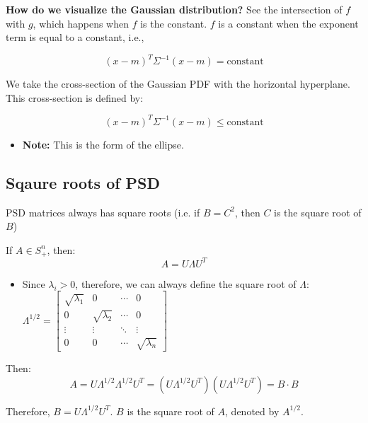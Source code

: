 \begin{example}


    \vspace{1em}

    \textbf{How do we visualize the Gaussian distribution?} See the intersection of $f$ with $g$, which happens when $f$ is the constant. $f$ is a constant when the exponent term is equal to a constant, i.e., 

\[
(x - m)^T \Sigma^{-1} (x - m) = \text{constant}
\]

We take the cross-section of the Gaussian PDF with the horizontal hyperplane. This cross-section is defined by:

\[
(x - m)^T \Sigma^{-1} (x - m) \leq \text{constant}
\]
\begin{itemize}
    \item \textbf{Note:} This is the form of the ellipse.
\end{itemize}

\end{example}

\subsection{Sqaure roots of PSD}
\begin{definition}
    PSD matrices always has square roots (i.e. if $B=C^2$, then $C$ is the square root of $B$)

If $A \in S_+^n$, then:
\[
A = U \Lambda U^T
\]
\begin{itemize}
    \item Since $\lambda_i > 0$, therefore, we can always define the square root of $\Lambda$: $\Lambda^{1/2} = \begin{bmatrix} \sqrt{\lambda_1} & 0 & \cdots & 0 \\ 0 & \sqrt{\lambda_2} & \cdots & 0 \\ \vdots & \vdots & \ddots & \vdots \\ 0 & 0 & \cdots & \sqrt{\lambda_n} \end{bmatrix}$
\end{itemize}

Then:
\[
A = U \Lambda^{1/2} \Lambda^{1/2} U^T = (U \Lambda^{1/2} U^T)(U \Lambda^{1/2} U^T) = B \cdot B
\]

Therefore, $B = U \Lambda^{1/2} U^T$. $B$ is the square root of $A$, denoted by $A^{1/2}$.
\end{definition}

